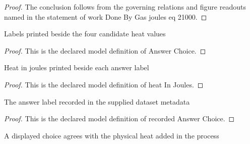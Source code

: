 \begin{proof}
  The conclusion follows from the governing relations and figure readouts named in the statement of work Done By Gas joules eq 21000.
\end{proof}
\begin{definition}
  \label{def:physics:phyx-mini-0338:phyxminiproblems-problemphyxmini0338-answerchoice}
  Labels printed beside the four candidate heat values
\end{definition}
\begin{proof}
  This is the declared model definition of Answer Choice.
\end{proof}
\begin{definition}
  \label{def:physics:phyx-mini-0338:phyxminiproblems-problemphyxmini0338-answerchoice-heatinjoules}
  Heat in joules printed beside each answer label
\end{definition}
\begin{proof}
  This is the declared model definition of heat In Joules.
\end{proof}
\begin{definition}
  \label{def:physics:phyx-mini-0338:phyxminiproblems-problemphyxmini0338-recordedanswerchoice}
  The answer label recorded in the supplied dataset metadata
\end{definition}
\begin{proof}
  This is the declared model definition of recorded Answer Choice.
\end{proof}
\begin{definition}
  \label{def:physics:phyx-mini-0338:phyxminiproblems-problemphyxmini0338-iscorrectdisplayedchoice}
  A displayed choice agrees with the physical heat added in the process
\end{definition}
